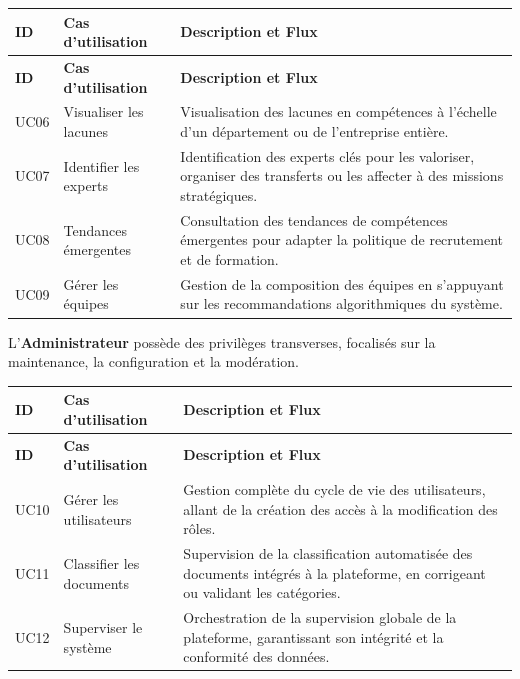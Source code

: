 \documentclass[12pt,a4paper]{article}
\begin{document}
\begin{longtable}{|p{1cm}|p{4.5cm}|p{8cm}|}
\toprule
\rowcolor{bleu!15}
\textbf{ID} & \textbf{Cas d'utilisation} & \textbf{Description et Flux} \\
\midrule
\endfirsthead
\toprule
\rowcolor{bleu!15}
\textbf{ID} & \textbf{Cas d'utilisation} & \textbf{Description et Flux} \\
\midrule
\endhead
UC06 & Visualiser les lacunes & Visualisation des lacunes en compétences à l'échelle d'un département ou de l'entreprise entière. \\
\midrule
UC07 & Identifier les experts & Identification des experts clés pour les valoriser, organiser des transferts ou les affecter à des missions stratégiques. \\
\midrule
UC08 & Tendances émergentes & Consultation des tendances de compétences émergentes pour adapter la politique de recrutement et de formation. \\
\midrule
UC09 & Gérer les équipes & Gestion de la composition des équipes en s'appuyant sur les recommandations algorithmiques du système. \\
\bottomrule
\end{longtable}

L'\textbf{Administrateur} possède des privilèges transverses, focalisés sur la maintenance, la configuration et la modération.

\begin{longtable}{|p{1cm}|p{4.5cm}|p{8cm}|}
\toprule
\rowcolor{bleu!15}
\textbf{ID} & \textbf{Cas d'utilisation} & \textbf{Description et Flux} \\
\midrule
\endfirsthead
\toprule
\rowcolor{bleu!15}
\textbf{ID} & \textbf{Cas d'utilisation} & \textbf{Description et Flux} \\
\midrule
\endhead
UC10 & Gérer les utilisateurs & Gestion complète du cycle de vie des utilisateurs, allant de la création des accès à la modification des rôles. \\
\midrule
UC11 & Classifier les documents & Supervision de la classification automatisée des documents intégrés à la plateforme, en corrigeant ou validant les catégories. \\
\midrule
UC12 & Superviser le système & Orchestration de la supervision globale de la plateforme, garantissant son intégrité et la conformité des données. \\
\bottomrule
\end{longtable}

\end{document}
